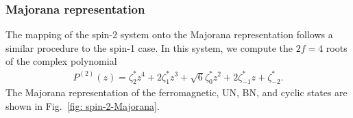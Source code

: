 \subsubsection{Majorana representation}
The mapping of the spin-2 system onto the Majorana representation follows a
similar procedure to the spin-1 case.
In this system, we compute the \(2f=4\) roots of the complex polynomial
\begin{align}
    P^{(2)}(z) = \zeta_2^*z^4 + 2\zeta_1^*z^3 + \sqrt{6}\zeta_0^*z^2
    + 2\zeta_{-1}^*z + \zeta_{-2}^*.
\end{align}
The Majorana representation of the ferromagnetic, UN, BN, and cyclic states
are shown in Fig.~\ref{fig: spin-2-Majorana}.
\begin{figure}
    \centering
\end{figure}
